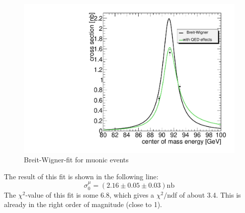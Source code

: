 \documentclass[epj,nopacs]{svjour}
\begin{document}
\begin{figure}[htb]
 \centering
 \includegraphics[width=1\columnwidth,keepaspectratio]{finalmu_fit}
 \caption{Breit-Wigner-fit for muonic events}
 \label{fig:fit_muons}
\end{figure}

The result of this fit is shown in the following line:
\begin{equation}
σ_0^μ = (2.16 \pm 0.05 \pm 0.03) \si{\nano\barn}
\end{equation}
The $χ^2$-value of this fit is some 6.8, which gives a $χ^2/$ndf of about 3.4.
This is already in the right order of magnitude (close to 1).
\end{document}
